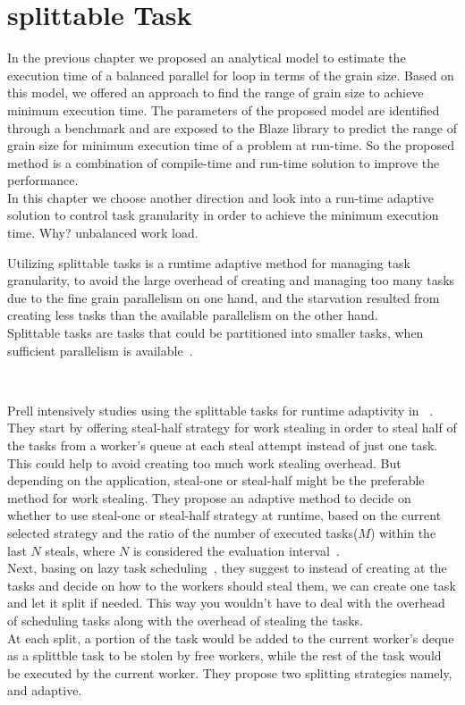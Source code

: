 \section{splittable Task}

In the previous chapter we proposed an analytical model to estimate the execution time of a balanced parallel for loop in terms of the grain size. Based on this model, we offered an approach to find the range of grain size to achieve minimum execution time. The parameters of the proposed model are identified through a benchmark and are exposed to the Blaze library to predict the range of grain size for minimum execution time of a problem at run-time. So the proposed method is a combination of compile-time and run-time solution to improve the performance.\\
In this chapter we choose another direction and look into a run-time adaptive solution to control task granularity in order to achieve the minimum execution time. Why? unbalanced work load.

Utilizing splittable tasks is a runtime adaptive method for managing task granularity, to avoid the large overhead of creating and managing too many tasks due to the fine grain parallelism on one hand, and the starvation resulted from creating less tasks than the available parallelism on the other hand.\\ 
Splittable tasks are tasks that could be partitioned into smaller tasks, when sufficient parallelism is available~\cite{prell2016embracing}. 

~\cite{robison2008optimization}

Prell intensively studies using the splittable tasks for runtime adaptivity in ~\cite{prell2016embracing}. They start by offering steal-half strategy for work stealing in order to steal half of the tasks from a worker's queue at each steal attempt instead of just one task. This could help to avoid creating too much work stealing overhead. But depending on the application, steal-one or steal-half might be the preferable method for work stealing. They propose an adaptive method to decide on whether to use steal-one or steal-half strategy at runtime, based on the current selected strategy and the ratio of the number of executed tasks($M$) within the last $N$ steals, where $N$ is considered the evaluation interval~\cite{prell2016embracing}.\\ 
Next, basing on lazy task scheduling~\cite{tzannes2014lazy}, they suggest to instead of creating at the tasks and decide on how to the workers should steal them, we can create one task and let it split if needed. This way you wouldn't have to deal with the overhead of scheduling tasks along with the overhead of stealing the tasks.\\
At each split, a portion of the task would be added to the current worker's deque as a splittble task to be stolen by free workers, while the rest of the task would be executed by the current worker.    
They propose two splitting strategies namely, and adaptive. 


